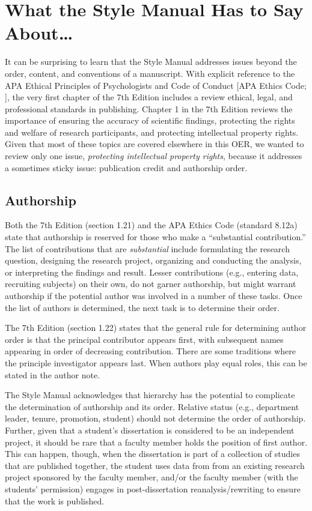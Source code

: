 \documentclass[
  11pt,
]{book}
\begin{document}
\section{What the Style Manual Has to Say About\ldots{}}\label{what-the-style-manual-has-to-say-about}

It can be surprising to learn that the Style Manual addresses issues beyond the order, content, and conventions of a manuscript. With explicit reference to the APA Ethical Principles of Psychologists and Code of Conduct {[}APA Ethics Code; \citet{american_psychological_association_ethical_2017}{]}, the very first chapter of the 7th Edition includes a review ethical, legal, and professional standards in publishing. Chapter 1 in the 7th Edition reviews the importance of ensuring the accuracy of scientific findings, protecting the rights and welfare of research participants, and protecting intellectual property rights. Given that most of these topics are covered elsewhere in this OER, we wanted to review only one issue, \emph{protecting intellectual property rights}, because it addresses a sometimes sticky issue: publication credit and authorship order.

\subsection{Authorship}\label{authorship}

Both the 7th Edition (section 1.21) and the APA Ethics Code (standard 8.12a) state that authorship is reserved for those who make a ``substantial contribution.'' The list of contributions that are \emph{substantial} include formulating the research question, designing the research project, organizing and conducting the analysis, or interpreting the findings and result. Lesser contributions (e.g., entering data, recruiting subjects) on their own, do not garner authorship, but might warrant authorship if the potential author was involved in a number of these tasks. Once the list of authors is determined, the next task is to determine their order.

The 7th Edition (section 1.22) states that the general rule for determining author order is that the principal contributor appears first, with subsequent names appearing in order of decreasing contribution. There are some traditions where the principle investigator appears last. When authors play equal roles, this can be stated in the author note.

The Style Manual acknowledges that hierarchy has the potential to complicate the determination of authorship and its order. Relative status (e.g., department leader, tenure, promotion, student) should not determine the order of authorship. Further, given that a student's dissertation is considered to be an independent project, it should be rare that a faculty member holds the position of first author. This can happen, though, when the dissertation is part of a collection of studies that are published together, the student uses data from from an existing research project sponsored by the faculty member, and/or the faculty member (with the students' permission) engages in post-dissertation reanalysis/rewriting to ensure that the work is published.
\end{document}
